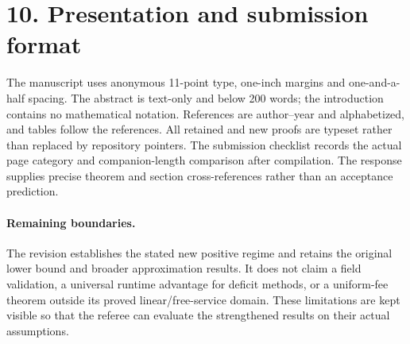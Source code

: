 \documentclass[11pt,letterpaper]{article}
\theoremstyle{definition}\newtheorem{remark}[theorem]{Remark}
\begin{document}
\section*{10. Presentation and submission format}
The manuscript uses anonymous 11-point type, one-inch margins and one-and-a-half spacing. The abstract is text-only and below 200 words; the introduction contains no mathematical notation. References are author--year and alphabetized, and tables follow the references. All retained and new proofs are typeset rather than replaced by repository pointers. The submission checklist records the actual page category and companion-length comparison after compilation. The response supplies precise theorem and section cross-references rather than an acceptance prediction.

\paragraph{Remaining boundaries.} The revision establishes the stated new positive regime and retains the original lower bound and broader approximation results. It does not claim a field validation, a universal runtime advantage for deficit methods, or a uniform-fee theorem outside its proved linear/free-service domain. These limitations are kept visible so that the referee can evaluate the strengthened results on their actual assumptions.
\end{document}
